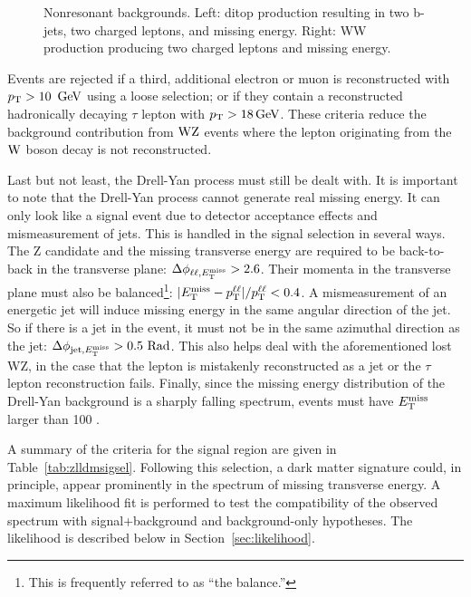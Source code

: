 \begin{figure}[!thbp]
 \caption{Nonresonant backgrounds. Left: ditop production resulting in two b-jets, two charged leptons, and missing energy. Right: WW production producing two charged leptons and missing energy.}
 \label{fig:dmnrb}
\end{figure}

Events are rejected if a third, additional electron or muon is reconstructed with $p_{\mathrm{T}} > 10~\,\text{Ge\hspace{-.08em}V}$ using a loose selection; 
or if they contain a reconstructed hadronically decaying $\tau$ lepton with $p_{\mathrm{T}}>18\,\text{Ge\hspace{-.08em}V}$.
These criteria reduce the background contribution from $\mathrm{W}\mathrm{Z}$ events
where the lepton originating from the $\mathrm{W}$ boson decay is not reconstructed.

Last but not least, the Drell-Yan process must still be dealt with.
It is important to note that the Drell-Yan process cannot generate real missing energy.
It can only look like a signal event due to detector acceptance effects and mismeasurement of jets.
This is handled in the signal selection in several ways.
The Z candidate and the missing transverse energy are required to be back-to-back in the transverse plane: $\Delta \phi_{\ell\ell,E_\mathrm{T}^{\mathrm{miss}}} > 2.6$.
Their momenta in the transverse plane must also be balanced\footnote{This is frequently referred to as ``the balance.''}: $|E_\mathrm{T}^{\mathrm{miss}}-p_{\mathrm{T}}^{\ell\ell}|/p_{\mathrm{T}}^{\ell\ell} < 0.4$.
A mismeasurement of an energetic jet will induce missing energy in the same angular direction of the jet.
So if there is a jet in the event, it must not be in the same azimuthal direction as the jet: $\Delta \phi_{{\rm jet},E_\mathrm{T}^{\mathrm{miss}}} > 0.5~ \mathrm{Rad}$.
This also helps deal with the aforementioned lost WZ, in the case that the lepton is
mistakenly reconstructed as a jet or the $\tau$ lepton reconstruction fails.
Finally, since the missing energy distribution of the Drell-Yan background is a sharply falling spectrum,
events must have $E_\mathrm{T}^{\mathrm{miss}}$ larger than 100 \GeV.

A summary of the criteria for the signal region are given in Table~\ref{tab:zlldmsigsel}.
Following this selection, a dark matter signature could, in principle, appear prominently in the spectrum of missing transverse energy.
A maximum likelihood fit is performed to test the compatibility of the observed spectrum with signal+background and background-only hypotheses.
The likelihood is described below in Section~\ref{sec:likelihood}.

